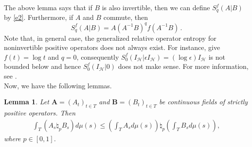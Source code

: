 \documentclass[12pt, reqno]{amsart}
\newtheorem{lemma}[theorem]{Lemma}
\theoremstyle{definition}
\theoremstyle{remark}
\numberwithin{equation}{section}
\begin{document}
The above lemma says that if $B$ is also invertible, then we can define $S_q^f(A|B)$ by \eqref{e2}. Furthermore, if $A$ and $B$ commute, then
$$
S_q^f(A|B)=A \left(A^{-1}B\right)^q f\left(A^{-1}B\right)\,.
$$
Note that, in general case, the generalized relative operator entropy for noninvertible positive operators does not always exist. For instance, give $f(t)=\log t$ and $q=0$, consequently $S_0^f(I_{\mathscr H}|\epsilon I_{\mathscr H})=(\log\epsilon)I_{\mathscr H}$ is not bounded below and hence $S_0^f(I_{\mathscr H}|0)$ does not make sense. For more information, see \cite{FMPS}.\\
Now, we have the following lemmas.
\begin{lemma}
Let $\mathbf{A}=(A_t)_{t\in T}$ and $\mathbf{B}=(B_t)_{t\in T}$ be continuous fields of strictly positive operators. Then
\begin{align}\label{kian12}
\int_T(A_s \natural_p B_s)d\mu(s) \le
\left(\int_TA_sd\mu(s)\right) \natural_p
\left(\int_TB_sd\mu(s)\right),
\end{align}
where $p\in[0,1]$.
\end{lemma}
\end{document}
